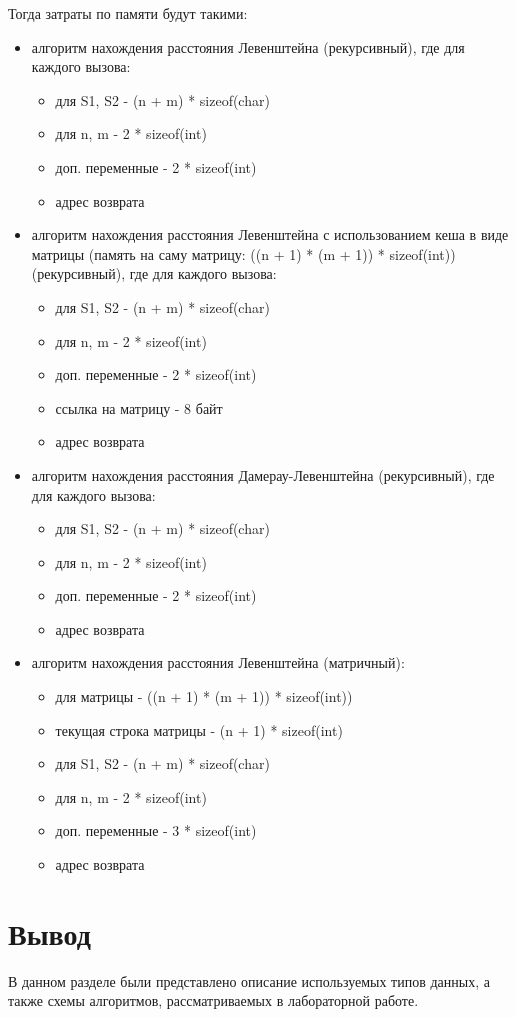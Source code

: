 Тогда затраты по памяти будут такими:
\begin{itemize}
    \item алгоритм нахождения расстояния Левенштейна (рекурсивный), где для каждого вызова:

    \begin{itemize}
        \item для S1, S2 - (n + m) * sizeof(char)
        \item для n, m - 2 * sizeof(int)
        \item доп. переменные - 2 * sizeof(int)
        \item адрес возврата
    \end{itemize}

    \item алгоритм нахождения расстояния Левенштейна с использованием кеша в виде матрицы (память на саму матрицу: ((n + 1) * (m + 1)) * sizeof(int)) (рекурсивный), где для каждого вызова:

    \begin{itemize}
        \item для S1, S2 - (n + m) * sizeof(char)
        \item для n, m - 2 * sizeof(int)
        \item доп. переменные - 2 * sizeof(int)
        \item ссылка на матрицу - 8 байт
        \item адрес возврата
    \end{itemize}

    \item алгоритм нахождения расстояния Дамерау-Левенштейна (рекурсивный), где для каждого вызова:

    \begin{itemize}
        \item для S1, S2 - (n + m) * sizeof(char)
        \item для n, m - 2 * sizeof(int)
        \item доп. переменные - 2 * sizeof(int)
        \item адрес возврата
    \end{itemize}


    \item алгоритм нахождения расстояния Левенштейна (матричный):

    \begin{itemize}
        \item для матрицы - ((n + 1) * (m + 1)) * sizeof(int)) 
        \item текущая строка матрицы - (n + 1) * sizeof(int)
        \item для S1, S2 - (n + m) * sizeof(char)
        \item для n, m - 2 * sizeof(int)
        \item доп. переменные - 3 * sizeof(int)
        \item адрес возврата
    \end{itemize}
\end{itemize}

\section{Вывод}
В данном разделе были представлено описание используемых типов данных, а также схемы алгоритмов, рассматриваемых в лабораторной работе.